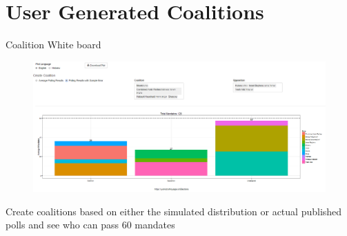 \documentclass[11pt]{beamer}
\begin{document}
\section{User Generated Coalitions}
\begin{frame}{Coalition White board}

	\begin{figure}[h]
					\centering
					\includegraphics[width=1\linewidth]{../www/coal_screen_grab}
					\label{fig:coal_screen_grab}
	\end{figure}
\begin{block}{Create coalitions based on either the simulated distribution or actual published polls and see who can pass 60 mandates}
\end{block}
\end{frame}
\end{document}
